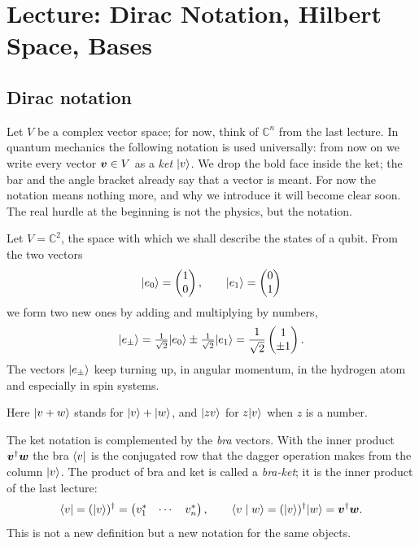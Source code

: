 
\section{Lecture: Dirac Notation, Hilbert Space, Bases}

\subsection{Dirac notation}
Let $V$ be a complex vector space; for now, think of $\mathbb{C}^n$ from the last lecture. In quantum mechanics the following notation is used universally: from now on we write every vector $\boldsymbol{v}\in V$ as a \emph{ket} $\lvert v \rangle$. We drop the bold face inside the ket; the bar and the angle bracket already say that a vector is meant. For now the notation means nothing more, and why we introduce it will become clear soon. The real hurdle at the beginning is not the physics, but the notation.

\begin{example}
	Let $V = \mathbb{C}^2$, the space with which we shall describe the states of a qubit. From the two vectors
	\begin{equation}
		\lvert e_0 \rangle = \begin{pmatrix} 1 \\ 0 \end{pmatrix}, \qquad
		\lvert e_1 \rangle = \begin{pmatrix} 0 \\ 1 \end{pmatrix}
	\end{equation}
	we form two new ones by adding and multiplying by numbers,
	\begin{equation}
		\lvert e_\pm \rangle = \tfrac{1}{\sqrt{2}}\lvert e_0 \rangle \pm \tfrac{1}{\sqrt{2}}\lvert e_1 \rangle
		= \frac{1}{\sqrt{2}} \begin{pmatrix} 1 \\ \pm 1 \end{pmatrix}.
	\end{equation}
	The vectors $\lvert e_\pm \rangle$ keep turning up, in angular momentum, in the hydrogen atom and especially in spin systems.
\end{example}

Here $\lvert v + w \rangle$ stands for $\lvert v \rangle + \lvert w \rangle$, and $\lvert zv \rangle$ for $z\lvert v \rangle$ when $z$ is a number.

The ket notation is complemented by the \emph{bra} vectors. With the inner product $\boldsymbol{v}^{\dagger}\boldsymbol{w}$ the bra $\langle v \rvert$ is the conjugated row that the dagger operation makes from the column $\lvert v \rangle$. The product of bra and ket is called a \emph{bra-ket}; it is the inner product of the last lecture:
\begin{equation}
	\langle v \rvert = (\lvert v \rangle)^{\dagger} = \begin{pmatrix} v_1^* & \cdots & v_n^* \end{pmatrix}, \qquad
	\langle v \mid w \rangle = (\lvert v \rangle)^{\dagger}\lvert w \rangle = \boldsymbol{v}^{\dagger}\boldsymbol{w}.
\end{equation}
This is not a new definition but a new notation for the same objects.

